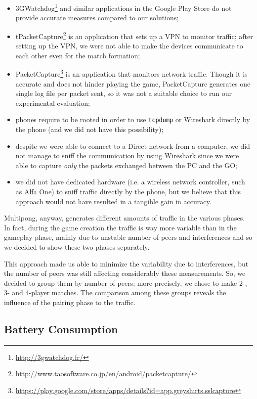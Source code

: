 \begin{itemize}
  \item 3GWatchdog\footnote{\url{http://3gwatchdog.fr/}} and similar
    applications in the Google Play Store do not provide accurate measures
    compared to our solutions;
  \item tPacketCapture\footnote{\url{http://www.taosoftware.co.jp/en/android/packetcapture/}}
    is an application that sets up a VPN to monitor traffic; after setting up
    the VPN, we were not able to make the devices communicate to each other
    even for the match formation;
  \item PacketCapture\footnote{\url{https://play.google.com/store/apps/details?id=app.greyshirts.sslcapture}}
    is an application that monitors network traffic. Though it is accurate and
    does not hinder playing the game, PacketCapture generates one single log
    file per packet sent, so it was not a suitable choice to run our
    experimental evaluation;
  \item phones require to be rooted in order to use \texttt{tcpdump} or
    Wireshark directly by the phone (and we did not have this possibility);
  \item despite we were able to connect to a \wifi{} Direct network from a
    computer, we did not manage to sniff the communication by using Wireshark
    since we were able to capture \textit{only} the packets exchanged between
    the PC and the GO;
  \item we did not have dedicated hardware (i.e. a wireless network controller, 
    such as Alfa One) to sniff traffic directly by the phone, but we believe 
    that this approach would not have resulted in a tangible gain in accuracy.
\end{itemize}

Multipong, anyway, generates different amounts of traffic in the various
phases. In fact, during the game creation the traffic is way more variable than
in the gameplay phase, mainly due to unstable number of peers and \wifi{}
interferences and so we decided to show these two phases separately.

This approach made us able to minimize the variability due to interferences, 
but the number of peers was still affecting considerably these measurements. 
So, we decided to group them by number of peers; more precisely, we chose to 
make 2-, 3- and 4-player matches. The comparison among these groups reveals 
the influence of the pairing phase to the traffic.

\subsection{Battery Consumption}

